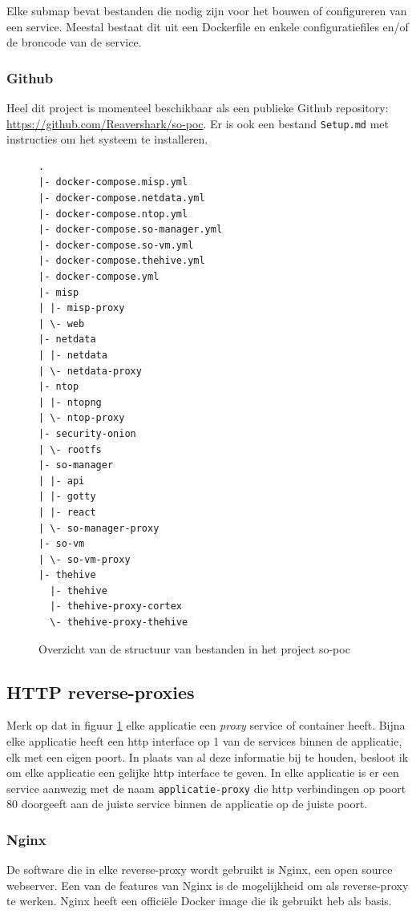 \documentclass[a4paper,12pt]{report}
\begin{document}
Elke submap bevat bestanden die nodig zijn voor het bouwen of configureren van een service.
Meestal bestaat dit uit een Dockerfile en enkele configuratiefiles en/of de broncode van de service.

\subsubsection{Github}
Heel dit project is momenteel beschikbaar als een publieke Github repository: \url{https://github.com/Reavershark/so-poc}.
Er is ook een bestand \lstinline|Setup.md| met instructies om het systeem te installeren.

\begin{figure}[H]
  \begin{lstlisting}
.
|- docker-compose.misp.yml
|- docker-compose.netdata.yml
|- docker-compose.ntop.yml
|- docker-compose.so-manager.yml
|- docker-compose.so-vm.yml
|- docker-compose.thehive.yml
|- docker-compose.yml
|- misp
| |- misp-proxy
| \- web
|- netdata
| |- netdata
| \- netdata-proxy
|- ntop
| |- ntopng
| \- ntop-proxy
|- security-onion
| \- rootfs
|- so-manager
| |- api
| |- gotty
| |- react
| \- so-manager-proxy
|- so-vm
| \- so-vm-proxy
|- thehive
  |- thehive
  |- thehive-proxy-cortex
  \- thehive-proxy-thehive
  \end{lstlisting}
  \caption{Overzicht van de structuur van bestanden in het project so-poc}
  \label{fig:so-poc-structuur-docker-compose-containers}
\end{figure}

\subsection{HTTP reverse-proxies}
Merk op dat in figuur \ref{fig:so-poc-structuur-docker-compose-containers} elke applicatie een \emph{proxy} service of container heeft.
Bijna elke applicatie heeft een http interface op 1 van de services binnen de applicatie, elk met een eigen poort.
In plaats van al deze informatie bij te houden, besloot ik om elke applicatie een gelijke http interface te geven.
In elke applicatie is er een service aanwezig met de naam \lstinline|applicatie-proxy| die http verbindingen op poort 80 doorgeeft aan de juiste service binnen de applicatie op de juiste poort.

\subsubsection{Nginx}
De software die in elke reverse-proxy wordt gebruikt is Nginx, een open source webserver.
Een van de features van Nginx is de mogelijkheid om als reverse-proxy te werken.
Nginx heeft een officiële Docker image die ik gebruikt heb als basis.
\autocite{nginx:about}
\end{document}
